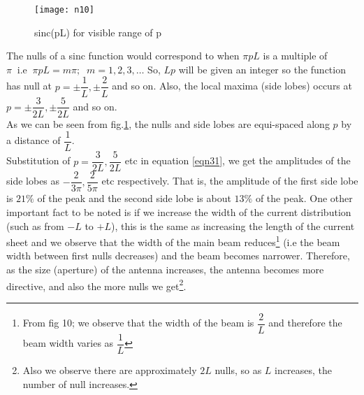 \begin{figure}[h]
	\centering
	\texttt{[image: n10]}
	\caption{sinc(pL) for visible range of p}
	\label{fig10}
\end{figure}

The nulls of a sinc function would correspond to when $\pi pL$ is a multiple of $\pi \; \; \text{i.e} \; \; \pi pL = m\pi ; \; \; m = 1, 2, 3, \ldots$ So, $Lp$ will be given an integer so the function has null at $p = \pm\dfrac{1}{L}, \pm\dfrac{2}{L}$ and so on. Also, the local maxima (side lobes) occurs at $p = \pm\dfrac{3}{2L}, \pm\dfrac{5}{2L}$ and so on.\\
As we can be seen from fig.\ref{fig10}, the nulls and side lobes are equi-spaced along $p$ by a distance of $\dfrac{1}{L}$.\\

Substitution of $p = \dfrac{3}{2L}, \dfrac{5}{2L}$ etc in equation \ref{eqn31}, we get the amplitudes of the side lobes as $-\dfrac{2}{3\pi}, \dfrac{2}{5\pi}$ etc respectively. That is, the amplitude of the first side lobe is $21\% $ of the peak and the second side lobe is about $13\%$ of the peak. One other important fact to be noted is if we increase the width of the current distribution (such as from $-L$ to $+L$), this is the same as increasing the length of the current sheet and we observe that the width of the main beam reduces\footnote{From fig 10; we observe that the width of the beam is $\dfrac{2}{L}$ and therefore the beam width varies as $\dfrac{1}{L}$} (i.e the beam width between first nulls decreases) and the beam becomes narrower. Therefore, as the size (aperture) of the antenna increases, the antenna becomes more directive, and also the more nulls we get\footnote{Also we observe there are approximately $2L$ nulls, so as $L$ increases, the number of null increases.}.


